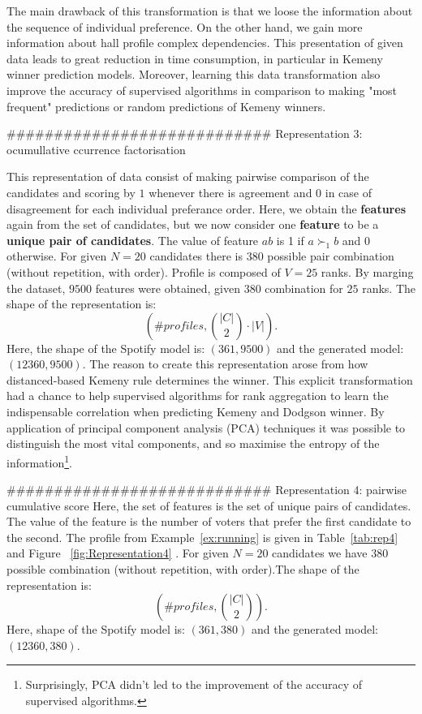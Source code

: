 The main drawback of this transformation is that we loose the information about the sequence of individual preference. On the other hand, we gain more information about hall profile complex dependencies. This presentation of given data leads to great reduction in time consumption, in particular in Kemeny winner prediction models. Moreover, learning this data transformation also improve the accuracy of supervised algorithms in comparison to making "most frequent" predictions or random predictions of Kemeny winners.

############################
Representation 3: ocumullative ccurrence factorisation

This representation of data consist of making pairwise comparison of the candidates and scoring by $1$ whenever there is agreement and $0$ in case of disagreement for each individual preferance order. Here, we obtain the \textbf{features} again from the set of candidates, but we now consider one \textbf{feature} to be a\textbf{ unique pair of candidates}. The value of feature $ab$ is 1 if $a \succ_1 b$ and 0 otherwise. 
For given $N=20$ candidates there is $380$ possible pair combination (without repetition, with order). Profile is composed of $V=25$ ranks. By marging the dataset, $9500$ features were obtained, given $380$ combination for $25$ ranks. 
The shape of the   representation is: $$( \# profiles, \binom{|C|}{2} \cdot |V|).$$ Here, the shape of the Spotify model is: $(361, 9500)$ and the generated model: $(12360, 9500)$.
The reason to create this representation arose from how distanced-based Kemeny rule determines the winner. This explicit transformation had a chance to help supervised algorithms for rank aggregation to learn the indispensable correlation when predicting Kemeny and Dodgson winner. By application of principal component analysis (PCA) techniques it was possible to distinguish the most vital components, and so maximise the entropy of the information\footnote{Surprisingly, PCA  didn't led to the improvement of the accuracy of supervised algorithms.}.

############################
Representation 4: pairwise cumulative score
Here, the set of features is the set of unique pairs of candidates. The value of the feature is the number of voters that prefer the first candidate to the second. 
The profile from Example~\ref{ex:running} is given in Table~\ref{tab:rep4} and Figure~ \ref{fig:Representation4} .
For given $N=20$ candidates we have  $380$ possible combination (without repetition, with order).The shape of the representation is: $$( \# profiles, \binom{|C|}{2}).$$Here, shape of the Spotify model is: $(361, 380)$ and the generated model: $(12360, 380)$.


